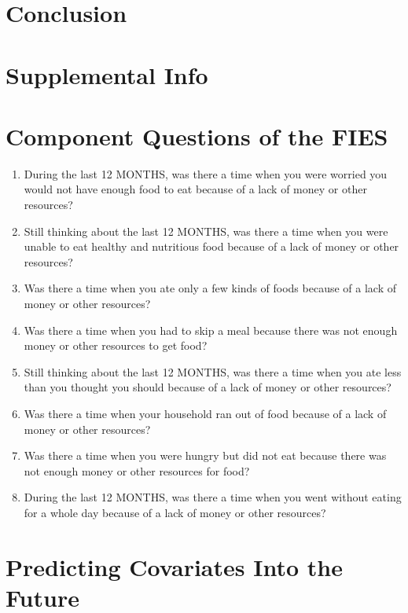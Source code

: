 \documentclass{article}
\begin{document}
\section{Conclusion}

\printbibliography

\section*{Supplemental Info}
\setcounter{table}{0}
\setcounter{figure}{0}
\setcounter{section}{0}
\renewcommand{\thetable}{S\arabic{table}}
\renewcommand{\thefigure}{S\arabic{figure}}
\renewcommand{\thesection}{S\arabic{section}}

\section{Component Questions of the FIES}
\begin{enumerate}
	\item During the last 12 MONTHS, was there a time when you were worried you would not have enough food to eat because of a lack of money or other resources?
	\item Still thinking about the last 12 MONTHS, was there a time when you were unable to eat healthy and nutritious food because of a lack of money or other resources?
	\item Was there a time when you ate only a few kinds of foods because of a lack of money or other resources?
	\item Was there a time when you had to skip a meal because there was not enough money or other resources to get food?
	\item Still thinking about the last 12 MONTHS, was there a time when you ate less than you thought you should because of a lack of money or other resources?
	\item Was there a time when your household ran out of food because of a lack of money or other resources?
	\item Was there a time when you were hungry but did not eat because there was not enough money or other resources for food?
	\item During the last 12 MONTHS, was there a time when you went without eating for a whole day because of a lack of money or other resources?
\end{enumerate}

\section{Predicting Covariates Into the Future}
\end{document}
